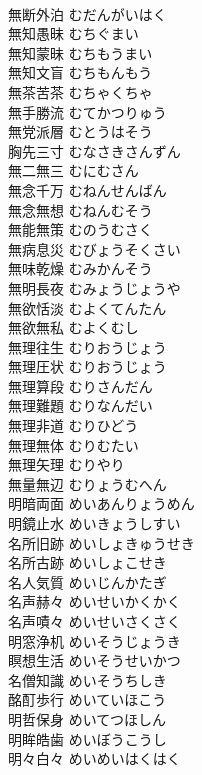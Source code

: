 \documentclass[8pt]{extreport}
\begin{document}
\begin{CJK}{UTF8}{min}
\\	無断外泊	むだんがいはく	
\\	無知愚昧	むちぐまい	
\\	無知蒙昧	むちもうまい	
\\	無知文盲	むちもんもう	
\\	無茶苦茶	むちゃくちゃ	
\\	無手勝流	むてかつりゅう	
\\	無党派層	むとうはそう	
\\	胸先三寸	むなさきさんずん	
\\	無二無三	むにむさん	
\\	無念千万	むねんせんばん	
\\	無念無想	むねんむそう	
\\	無能無策	むのうむさく	
\\	無病息災	むびょうそくさい	
\\	無味乾燥	むみかんそう	
\\	無明長夜	むみょうじょうや	
\\	無欲恬淡	むよくてんたん	
\\	無欲無私	むよくむし	
\\	無理往生	むりおうじょう	
\\	無理圧状	むりおうじょう	
\\	無理算段	むりさんだん	
\\	無理難題	むりなんだい	
\\	無理非道	むりひどう	
\\	無理無体	むりむたい	
\\	無理矢理	むりやり	
\\	無量無辺	むりょうむへん	
\\	明暗両面	めいあんりょうめん	
\\	明鏡止水	めいきょうしすい	
\\	名所旧跡	めいしょきゅうせき	
\\	名所古跡	めいしょこせき	
\\	名人気質	めいじんかたぎ	
\\	名声赫々	めいせいかくかく	
\\	名声嘖々	めいせいさくさく	
\\	明窓浄机	めいそうじょうき	
\\	瞑想生活	めいそうせいかつ	
\\	名僧知識	めいそうちしき	
\\	酩酊歩行	めいていほこう	
\\	明哲保身	めいてつほしん	
\\	明眸皓歯	めいぼうこうし	
\\	明々白々	めいめいはくはく	

\end{CJK}
\end{document}
